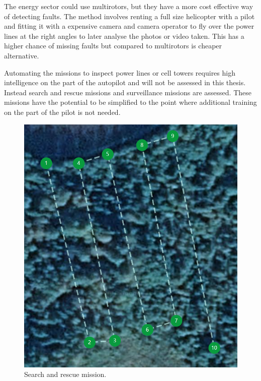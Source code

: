 \documentclass[12pt,oneside]{reedthesis}
\theoremstyle{definition}
\theoremstyle{definition}
\theoremstyle{definition}
\theoremstyle{remark}
\begin{document}
The energy sector could use multirotors, but they have a more cost
effective way of detecting faults. The method involves renting a full
size helicopter with a pilot and fitting it with a expensive camera and
camera operator to fly over the power lines at the right angles to later
analyse the photos or video taken. This has a higher chance of missing
faults but compared to multirotors is cheaper alternative.

Automating the missions to inspect power lines or cell towers requires
high intelligence on the part of the autopilot and will not be assessed
in this thesis. Instead search and rescue missions and surveillance
missions are assessed. These missions have the potential to be
simplified to the point where additional training on the part of the
pilot is not needed.
\begin{figure}
\centering
\includegraphics{./figure/scanningMission.PNG}
\caption[\label{fig:scanning}Search and rescue
mission.]{\label{fig:scanning}Search and rescue mission.\footnotemark{}}
\end{figure}
\end{document}
